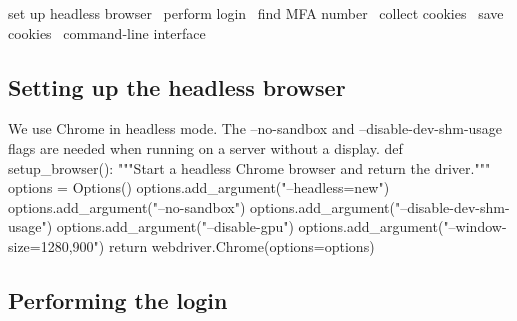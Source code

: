 \LA{}set up headless browser~{\nwtagstyle{}}\RA{}
\LA{}perform login~{\nwtagstyle{}}\RA{}
\LA{}find MFA number~{\nwtagstyle{}}\RA{}
\LA{}collect cookies~{\nwtagstyle{}}\RA{}
\LA{}save cookies~{\nwtagstyle{}}\RA{}
\LA{}command-line interface~{\nwtagstyle{}}\RA{}
\nwnotused{[[mfa.py]]}\nwendcode{}\nwdocspar

\subsection{Setting up the headless browser}

We use Chrome in headless mode.
The {\Tt{}--no-sandbox\nwendquote} and {\Tt{}--disable-dev-shm-usage\nwendquote} flags are needed
when running on a server without a display.
\nwenddocs{}\endmoddef\nwstartdeflinemarkup{}\nwenddeflinemarkup
def setup_browser():
  """Start a headless Chrome browser and return the driver."""
  options = Options()
  options.add_argument("--headless=new")
  options.add_argument("--no-sandbox")
  options.add_argument("--disable-dev-shm-usage")
  options.add_argument("--disable-gpu")
  options.add_argument("--window-size=1280,900")
  return webdriver.Chrome(options=options)
\nwendcode{}\nwdocspar

\subsection{Performing the login}

